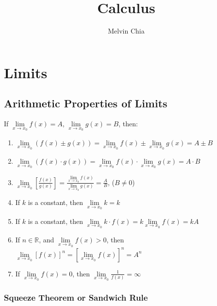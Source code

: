\documentclass{report}
\title{Calculus}
\author{Melvin Chia}
\begin{document}
\maketitle
\tableofcontents

\chapter{Limits}

\section{Arithmetic Properties of Limits}

\begin{mdframed}
      If $\lim\limits_{x \to x_0} f(x) = A$, $\lim\limits_{x \to x_0} g(x) = B$, then:
      \begin{enumerate}[label= (\alph*)]
            \item $\lim\limits_{x \to x_0} (f(x) \pm g(x)) = \lim\limits_{x \to x_0} f(x) \pm \lim\limits_{x \to x_0} g(x) = A \pm B$
            \item $\lim\limits_{x \to x_0} (f(x) \cdot g(x)) = \lim\limits_{x \to x_0} f(x) \cdot \lim\limits_{x \to x_0} g(x) = A \cdot B$
            \item $\lim\limits_{x \to x_0} \left[\frac{f(x)}{g(x)}\right] = \frac{\lim\limits_{x \to x_0} f(x)}{\lim\limits_{x \to x_0} g(x)} = \frac{A}{B}$, ($B \neq 0$)
            \item If $k$ is a constant, then $\lim\limits_{x \to x_0} k = k$
            \item If $k$ is a constant, then $\lim\limits_{x \to x_0} k \cdot f(x) = k
                        \lim\limits_{x \to x_0} f(x) = kA$
            \item If $n \in \mathbb{R}$, and $\lim\limits_{x \to x_0} f(x) > 0$, then
                  $\lim\limits_{x \to x_0} {[f(x)]}^n = {\left[\lim\limits_{x \to
                                    x_0}f(x)\right]}^n = A^n$
            \item If $\lim\limits_{x \to x_0} f(x) = 0$, then $\lim\limits_{x \to x_0}
                        \frac{1}{f(x)} = \infty$
      \end{enumerate}
\end{mdframed}

\subsection*{Squeeze Theorem or Sandwich Rule}
\end{document}

